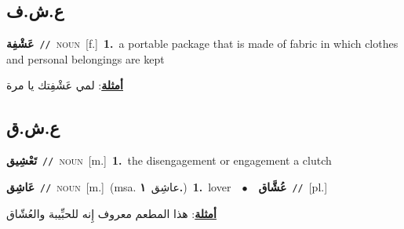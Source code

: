 \documentclass[10pt,a4paper,twoside]{article} %
\begin{document}
\begin{multicols}{2}
\vspace{-3mm}
\subsection*{\color{blue}\foreignlanguage{arabic}{ع.ش.ف}\color{blue}{}} 

{\setlength\topsep{0pt}\textbf{\foreignlanguage{arabic}{عَشْفِة}}\ {\color{gray}\texttt{//}\color{black}}\ \textsc{noun}\ [f.]\ \textbf{1.}~a portable package that is made of fabric in which clothes and personal belongings are kept\  \begin{flushright}\color{gray}\foreignlanguage{arabic}{\textbf{\underline{\foreignlanguage{arabic}{أمثلة}}}: لمي عَشْفِتك يا مرة}\end{flushright}\color{black}} \vspace{2mm}

\vspace{-3mm}
\subsection*{\color{blue}\foreignlanguage{arabic}{ع.ش.ق}\color{blue}{}} 

{\setlength\topsep{0pt}\textbf{\foreignlanguage{arabic}{تَعْشِيق}}\ {\color{gray}\texttt{//}\color{black}}\ \textsc{noun}\ [m.]\ \textbf{1.}~the disengagement or engagement a clutch\ } \vspace{2mm}

{\setlength\topsep{0pt}\textbf{\foreignlanguage{arabic}{عَاشِق}}\ {\color{gray}\texttt{//}\color{black}}\ \textsc{noun}\ [m.]\ \color{gray}(msa. \foreignlanguage{arabic}{عاشِق}~\foreignlanguage{arabic}{\textbf{١.}})\color{black}\ \textbf{1.}~lover\ \ $\bullet$\ \ \setlength\topsep{0pt}\textbf{\foreignlanguage{arabic}{عُشَّاق}}\ {\color{gray}\texttt{//}\color{black}}\ [pl.]\  \begin{flushright}\color{gray}\foreignlanguage{arabic}{\textbf{\underline{\foreignlanguage{arabic}{أمثلة}}}: هذا المطعم معروف إِنه للحبِّيبة والعُشّاق}\end{flushright}\color{black}} \vspace{2mm}


\end{multicols}
\end{document}
